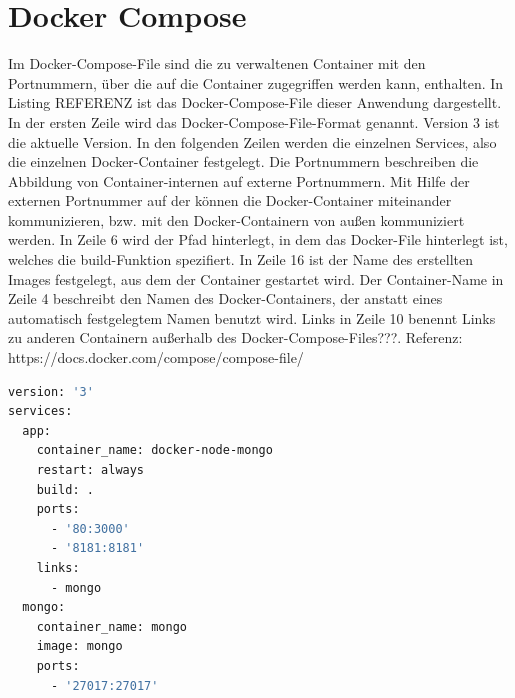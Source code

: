\section{Docker Compose}\label{sec:Docker-Compose}
Im Docker-Compose-File sind die zu verwaltenen Container mit den Portnummern, über die auf die Container zugegriffen werden kann, enthalten.
In Listing REFERENZ ist das Docker-Compose-File dieser Anwendung dargestellt.
In der ersten Zeile wird das Docker-Compose-File-Format genannt. Version 3 ist die aktuelle Version. In den folgenden Zeilen werden die einzelnen Services, also die einzelnen Docker-Container festgelegt.
Die Portnummern beschreiben die Abbildung von Container-internen auf externe Portnummern. Mit Hilfe der externen Portnummer auf der können die Docker-Container miteinander kommunizieren, bzw. mit den Docker-Containern von außen kommuniziert werden.
In Zeile 6 wird der Pfad hinterlegt, in dem das Docker-File hinterlegt ist, welches die build-Funktion spezifiert. 
In Zeile 16 ist der Name des erstellten Images festgelegt, aus dem der Container gestartet wird. Der Container-Name in Zeile 4 beschreibt den Namen des Docker-Containers, der anstatt eines automatisch festgelegtem Namen benutzt wird. Links in Zeile 10 benennt Links zu anderen Containern außerhalb des Docker-Compose-Files???. Referenz: https://docs.docker.com/compose/compose-file/
\begin{lstlisting}[language=bash, caption={docker-compose.yml-File}, label=lis:POST]
version: '3'
services:
  app:
    container_name: docker-node-mongo
    restart: always
    build: .
    ports:
      - '80:3000'
      - '8181:8181'
    links:
      - mongo
  mongo:
    container_name: mongo
    image: mongo
    ports:
      - '27017:27017'


\end{lstlisting}


